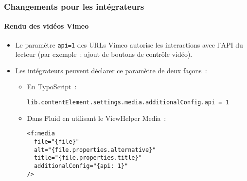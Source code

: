 
\begin{frame}[fragile]
	\frametitle{Changements pour les intégrateurs}
	\framesubtitle{Rendu des vidéos Vimeo}

	\lstset{basicstyle=\smaller\ttfamily}

	\begin{itemize}
		\item Le paramètre \texttt{api=1} des URLs Vimeo autorise les interactions
			avec l'API du lecteur (par exemple~: ajout de boutons de contrôle vidéo).
		\item Les intégrateurs peuvent déclarer ce paramètre de deux façons~:

		\begin{itemize}
			\item En TypoScript~:

\begin{lstlisting}
lib.contentElement.settings.media.additionalConfig.api = 1
\end{lstlisting}

			\item Dans Fluid en utilisant le ViewHelper Media~:

\begin{lstlisting}
<f:media
  file="{file}"
  alt="{file.properties.alternative}"
  title="{file.properties.title}"
  additionalConfig="{api: 1}"
/>
\end{lstlisting}

		\end{itemize}
	\end{itemize}

\end{frame}


